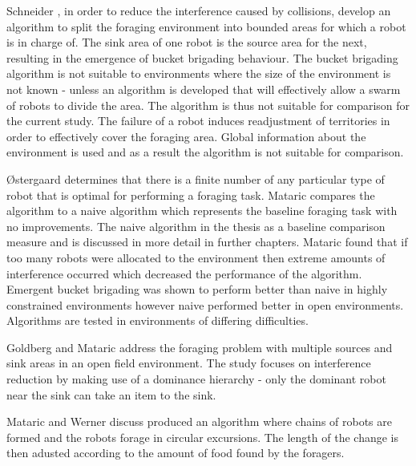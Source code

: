 Schneider \cite{schneider1998territorial}, in order to reduce the interference caused by collisions, develop an algorithm to split the foraging environment into bounded areas for which a robot is in charge of. The sink area of one robot is the source area for the next, resulting in the emergence of bucket brigading behaviour. The bucket brigading algorithm is not suitable to environments where the size of the environment is not known - unless an algorithm is developed that will effectively allow a swarm of robots to divide the area. The algorithm is thus not suitable for comparison for the current study. The failure of a robot induces readjustment of territories in order to effectively cover the foraging area. Global information about the environment is used and as a result the algorithm is not suitable for comparison. %

\O stergaard \cite{ostergaard2001emergent} determines that there is a finite number of any particular type of robot that is optimal for performing a foraging task. Mataric compares the algorithm to a naive algorithm which represents the baseline foraging task with no improvements. The naive algorithm in the thesis as a baseline comparison measure and is discussed in more detail in further chapters. Mataric found that if too many robots were allocated to the environment then extreme amounts of interference occurred which decreased the performance of the algorithm. Emergent bucket brigading was shown to perform better than naive in highly constrained environments however naive performed better in open environments. Algorithms are tested in environments of differing difficulties. %


Goldberg and Mataric \cite{Goldberg01designand} address the foraging problem with multiple sources and sink areas in an open field environment. The study focuses on interference reduction by making use of a dominance hierarchy - only the dominant robot near the sink can take an item to the sink. %

Mataric \cite{werger1996robotic} and Werner discuss produced an algorithm where chains of robots are formed and the robots forage in circular excursions. The length of the change is then adusted according to the amount of food found by the foragers. %
 
